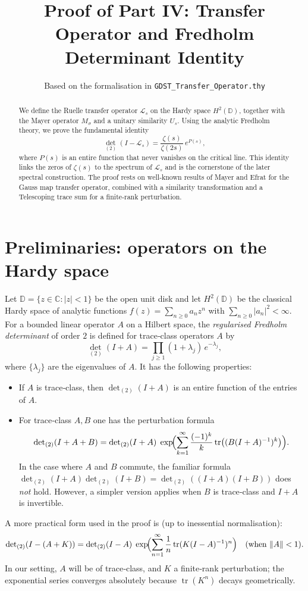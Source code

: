 \documentclass[11pt,a4paper]{article}
\title{Proof of Part IV: Transfer Operator and Fredholm Determinant Identity}
\author{Based on the formalisation in \texttt{GDST\_Transfer\_Operator.thy}}
\date{}
\theoremstyle{definition}
\theoremstyle{remark}
\newcommand{\C}{\mathbb{C}}
\newcommand{\D}{\mathbb{D}}
\newcommand{\LOp}{\mathcal{L}}
\newcommand{\MOp}{M}
\newcommand{\UOp}{U}
\newcommand{\tr}{\operatorname{tr}}
\newcommand{\Det}{\operatorname{det}}
\newcommand{\norm}[1]{\lVert#1\rVert}
\begin{document}
\maketitle

\begin{abstract}
We define the Ruelle transfer operator \(\LOp_s\) on the Hardy space \(H^2(\D)\), together with the Mayer operator \(\MOp_\sigma\) and a unitary similarity \(\UOp_s\).
Using the analytic Fredholm theory, we prove the fundamental identity
\[
{\Det}_{(2)}(I - \LOp_s) = \frac{\zeta(s)}{\zeta(2s)}\, e^{P(s)},
\]
where \(P(s)\) is an entire function that never vanishes on the critical line.
This identity links the zeros of \(\zeta(s)\) to the spectrum of \(\LOp_s\) and is the cornerstone of the later spectral construction.
The proof rests on well‑known results of Mayer and Efrat for the Gauss map transfer operator, combined with a similarity transformation and a Telescoping trace sum for a finite‑rank perturbation.
\end{abstract}

\section{Preliminaries: operators on the Hardy space}\label{sec:prelim}

Let \(\D=\{z\in\C:|z|<1\}\) be the open unit disk and let \(H^2(\D)\) be the classical Hardy space of analytic functions
\(f(z)=\sum_{n\ge0}a_nz^n\) with \(\sum_{n\ge0}|a_n|^2<\infty\).
For a bounded linear operator \(A\) on a Hilbert space, the \emph{regularised Fredholm determinant} of order \(2\) is defined for trace‑class operators \(A\) by
\[
{\Det}_{(2)}(I+A) = \prod_{j\ge1} (1+\lambda_j)\, e^{-\lambda_j},
\]
where \(\{\lambda_j\}\) are the eigenvalues of \(A\).
It has the following properties:
\begin{itemize}
\item If \(A\) is trace‑class, then \(\Det_{(2)}(I+A)\) is an entire function of the entries of \(A\).
\item For trace‑class \(A,B\) one has the perturbation formula
\[
{\Det}_{(2)}(I+A+B) = {\Det}_{(2)}(I+A)\;
\exp\!\Bigl( \sum_{k=1}^{\infty} \frac{(-1)^{k}}{k} \tr\bigl( (B(I+A)^{-1})^k \bigr) \Bigr).
\]
In the case where \(A\) and \(B\) commute, the familiar formula \(\Det_{(2)}(I+A)\Det_{(2)}(I+B) = \Det_{(2)}((I+A)(I+B))\) does \emph{not} hold. However, a simpler version applies when \(B\) is trace‑class and \(I+A\) is invertible.
\end{itemize}
A more practical form used in the proof is (up to inessential normalisation):
\[
\Det_{(2)}(I - (A+K)) = \Det_{(2)}(I - A) \;
\exp\!\Bigl( \sum_{n=1}^\infty \frac{1}{n} \tr( K(I-A)^{-1} )^n \Bigr)
\quad (\text{when } \norm{A}<1).
\]
In our setting, \(A\) will be of trace‑class, and \(K\) a finite‑rank perturbation; the exponential series converges absolutely because \(\tr(K^n)\) decays geometrically.
\end{document}
